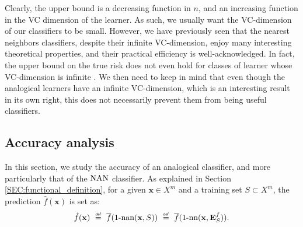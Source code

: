 Clearly, the upper bound is a decreasing function in $n$, and an increasing
function in the VC dimension of the learner. As such, we usually want the
VC-dimension of our classifiers to be small. However, we have previously seen
that the nearest neighbors classifiers, despite their infinite
VC-dimension, enjoy many interesting theoretical properties, and their
practical efficiency is well-acknowledged. In fact, the upper bound on the true
risk does not even hold for classes of learner whose VC-dimension is infinite
\cite{Bur98}. We then need to keep in mind that even though the analogical
learners have an infinite VC-dimension, which is an interesting result in its
own right, this does not necessarily prevent them from being useful
classifiers.

\subsection{Accuracy analysis}
\label{SEC:accuracy_analysis}

In this section, we study the accuracy of an analogical classifier, and more
particularly that of the $\mbox{NAN}$ classifier. As explained in Section
\ref{SEC:functional_definition}, for a given $\mathbf{x} \in X^m$ and a
training set $S \subset X^m$, the prediction $\hat{f}(\mathbf{x})$ is set as:
$$
\hat{f}(\mathbf{x}) ~ \eqdef ~ \albl{\nan(\mathbf{x}, S)} ~ \eqdef ~ \albl{\nn(\mathbf{x}, \esf)}.
$$

